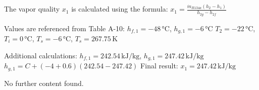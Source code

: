 The vapor quality \( x_1 \) is calculated using the formula:  
\( x_1 = \frac{\dot{m}_{R134a} (h_2 - h_1)}{h_{2g} - h_{2f}} \)  

Values are referenced from Table A-10:  
\( h_{f,1} = -48 \, \text{°C} \), \( h_{g,1} = -6 \, \text{°C} \)  
\( T_2 = -22 \, \text{°C} \), \( T_i = 0 \, \text{°C} \), \( T_s = -6 \, \text{°C} \), \( T_s = 267.75 \, \text{K} \)  

Additional calculations:  
\( h_{f,1} = 242.54 \, \text{kJ/kg} \), \( h_{g,1} = 247.42 \, \text{kJ/kg} \)  
\( h_{g,1} = C + (-4 + 0.6) (242.54 - 247.42) \)  
Final result: \( x_1 = 247.42 \, \text{kJ/kg} \)  

No further content found.